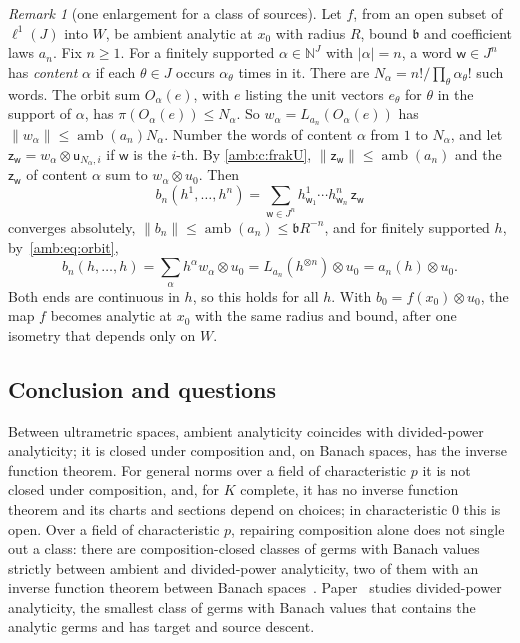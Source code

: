 \documentclass[11pt]{amsart}
\theoremstyle{definition}
\theoremstyle{remark}
\newtheorem{remark}[theorem]{Remark}
\numberwithin{equation}{section}
\newcommand{\N}{\mathbb N}
\newcommand{\abs}[1]{\lvert #1\rvert}
\newcommand{\norm}[1]{\lVert #1\rVert}
\theoremstyle{plain}
\theoremstyle{definition}
\theoremstyle{plain}
\begin{document}
\begin{remark}[one enlargement for a class of sources]
Let $f$, from an open subset of $\ell^1(J)$ into $W$, be ambient analytic at $x_0$ with radius $R$, bound $\mathfrak b$ and coefficient laws $a_n$. Fix $n\ge1$. For a finitely supported $\alpha\in\N^J$ with $\abs\alpha=n$, a word $\mathsf w\in J^n$ has \emph{content} $\alpha$ if each $\theta\in J$ occurs $\alpha_\theta$ times in it. There are $N_\alpha=n!/\prod_\theta\alpha_\theta!$ such words. The orbit sum $O_\alpha(e)$, with $e$ listing the unit vectors $e_\theta$ for $\theta$ in the support of $\alpha$, has $\pi(O_\alpha(e))\le N_\alpha$. So $w_\alpha=L_{a_n}(O_\alpha(e))$ has $\norm{w_\alpha}\le\operatorname{amb}(a_n)N_\alpha$. Number the words of content $\alpha$ from $1$ to $N_\alpha$, and let $\mathsf z_{\mathsf w}=w_\alpha\otimes\mathsf u_{N_\alpha,i}$ if $\mathsf w$ is the $i$-th. By \eqref{amb:c:frakU}, $\norm{\mathsf z_{\mathsf w}}\le\operatorname{amb}(a_n)$ and the $\mathsf z_{\mathsf w}$ of content $\alpha$ sum to $w_\alpha\otimes u_0$. Then
\[
 b_n(h^1,\dots,h^n)=\sum_{\mathsf w\in J^n}h^1_{\mathsf w_1}\cdots h^n_{\mathsf w_n}\,\mathsf z_{\mathsf w}
\]
converges absolutely, $\norm{b_n}\le\operatorname{amb}(a_n)\le \mathfrak bR^{-n}$, and for finitely supported $h$, by~\eqref{amb:eq:orbit},
\[
 b_n(h,\dots,h)=\sum_\alpha h^\alpha w_\alpha\otimes u_0=L_{a_n}(h^{\otimes n})\otimes u_0=a_n(h)\otimes u_0.
\]
Both ends are continuous in $h$, so this holds for all $h$. With $b_0=f(x_0)\otimes u_0$, the map $f$ becomes analytic at $x_0$ with the same radius and bound, after one isometry that depends only on $W$.
\end{remark}

\subsection{Conclusion and questions}\label{amb:ssec:end}

Between ultrametric spaces, ambient analyticity coincides with divided-power analyticity; it is closed under composition and, on Banach spaces, has the inverse function theorem. For general norms over a field of characteristic $p$ it is not closed under composition, and, for $K$ complete, it has no inverse function theorem and its charts and sections depend on choices; in characteristic $0$ this is open. Over a field of characteristic $p$, repairing composition alone does not single out a class: there are composition-closed classes of germs with Banach values strictly between ambient and divided-power analyticity, two of them with an inverse function theorem between Banach spaces~\cite{II}. Paper~\cite{II} studies divided-power analyticity, the smallest class of germs with Banach values that contains the analytic germs and has target and source descent.
\end{document}
